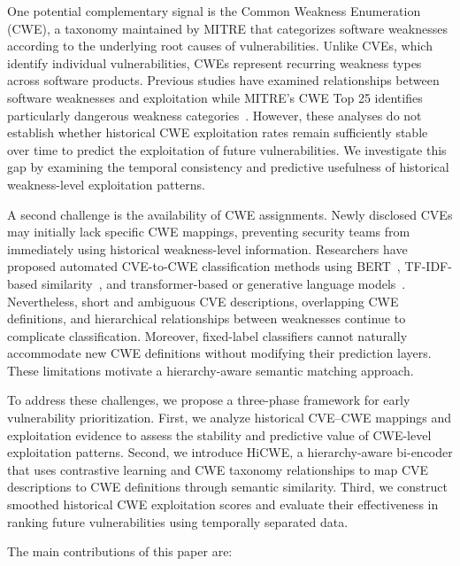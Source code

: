 \documentclass[conference,compsoc]{IEEEtran}
\begin{document}
One potential complementary signal is the Common
Weakness Enumeration (CWE), a taxonomy maintained
by MITRE that categorizes software weaknesses
according to the underlying root causes of
vulnerabilities. Unlike CVEs, which identify
individual vulnerabilities, CWEs represent recurring
weakness types across software products.
Previous studies have examined relationships
between software weaknesses and exploitation\cite{mell2020suite, galhardo2020measurements} 
while MITRE's CWE Top 25 identifies particularly
dangerous weakness categories~\cite{cwe_top25}.
However, these analyses do not establish whether
historical CWE exploitation rates remain sufficiently
stable over time to predict the exploitation of
future vulnerabilities. We investigate this gap
by examining the temporal consistency and
predictive usefulness of historical weakness-level
exploitation patterns.

A second challenge is the availability of CWE
assignments. Newly disclosed CVEs may initially
lack specific CWE mappings, preventing security
teams from immediately using historical
weakness-level information. Researchers have
proposed automated CVE-to-CWE classification
methods using BERT~\cite{das2021v2w},
TF-IDF-based similarity~\cite{albanese2024cve2cwe},
and transformer-based or generative language
models~\cite{mosievskiy2026roberta,
simonetto2026knowing}. Nevertheless, short
and ambiguous CVE descriptions, overlapping
CWE definitions, and hierarchical relationships
between weaknesses continue to complicate
classification. Moreover, fixed-label classifiers
cannot naturally accommodate new CWE definitions
without modifying their prediction layers.
These limitations motivate a hierarchy-aware
semantic matching approach.

To address these challenges, we propose a
three-phase framework for early vulnerability
prioritization. First, we analyze historical
CVE--CWE mappings and exploitation evidence
to assess the stability and predictive value
of CWE-level exploitation patterns.
Second, we introduce HiCWE, a hierarchy-aware
bi-encoder that uses contrastive learning
and CWE taxonomy relationships to map CVE
descriptions to CWE definitions through
semantic similarity. Third, we construct
smoothed historical CWE exploitation scores
and evaluate their effectiveness in ranking
future vulnerabilities using temporally
separated data.

The main contributions of this paper are:
\end{document}
